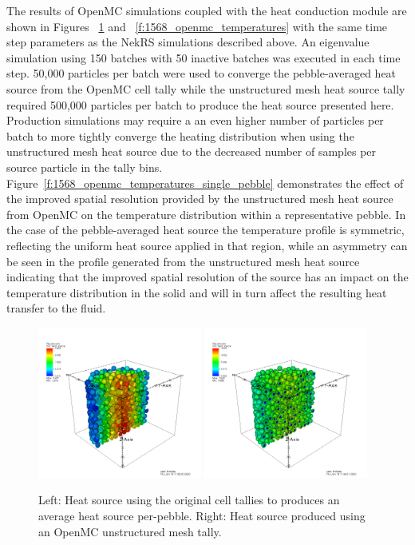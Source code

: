 The results of OpenMC simulations coupled with the heat conduction module are
shown in Figures ~\ref{f:1568_openmc_heat_source} and
~\ref{f:1568_openmc_temperatures} with the same time step parameters as the
NekRS simulations described above. An eigenvalue simulation using 150 batches
with 50 inactive batches was executed in each time step. 50,000 particles per
batch were used to converge the pebble-averaged heat source from the OpenMC cell
tally while the unstructured mesh heat source tally required 500,000 particles
per batch to produce the heat source presented here. Production simulations may
require a an even higher number of particles per batch to more tightly converge
the heating distribution when using the unstructured mesh heat source due to the
decreased number of samples per source particle in the tally bins.
Figure~\ref{f:1568_openmc_temperatures_single_pebble} demonstrates the effect of
the improved spatial resolution provided by the unstructured mesh heat source
from OpenMC on the temperature distribution within a representative pebble. In
the case of the pebble-averaged heat source the temperature profile is
symmetric, reflecting the uniform heat source applied in that region, while an
asymmetry can be seen in the profile generated from the unstructured mesh heat
source indicating that the improved spatial resolution of the source has an
impact on the temperature distribution in the solid and will in turn affect the
resulting heat transfer to the fluid.

\begin{figure}[!h]
\centering
\includegraphics[clip=true,width=0.48\textwidth]{Figures/openmc_cell_heat_source}
\includegraphics[clip=true,width=0.48\textwidth]{Figures/openmc_mesh_heat_source}
\caption{Left: Heat source using the original cell tallies to produces an average heat source per-pebble. Right: Heat source produced using an OpenMC unstructured mesh tally.}
\label{f:1568_openmc_heat_source}
\end{figure}

